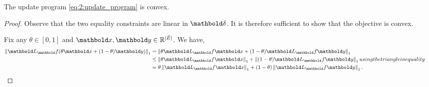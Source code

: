 \documentclass[nobib]{tufte-handout}
\newcommand{\Etil}{\Tilde{E}}
\begin{document}
\begin{lem}
The update program \eqref{eq:2:update_program} is convex.
\end{lem}
\begin{proof}
Observe that the two equality constraints are linear in $\vdelta$. It is therefore sufficient to show that the objective is convex.

Fix any $\theta \in [0,1]$ and $\vx, \vy \in \R^{|\Etil|}$. We have, \begin{align*}
    \norm{\mL_\vf (\theta\vx + (1-\theta)\vy)}_1 &= \norm{\theta \mL_\vf \vx + (1-\theta) \mL_\vf \vy}_1 \\
    &\leq \norm{\theta \mL_\vf \vx}_1 + \norm{(1-\theta) \mL_\vf \vy}_1 \margintag{using the triangle inequality} \\
    &= \theta\norm{\mL_\vf \vx}_1 + (1-\theta)\norm{\mL_\vf \vy}_1. \qedhere
\end{align*}
\end{proof}
\end{document}
